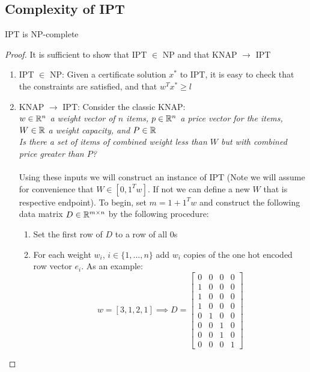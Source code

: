 \documentclass[12pt]{article}
\newcommand{\priv}{\text{IPT}}
\begin{document}
\subsection{Complexity of \gls{IPT}}
\begin{theorem}
    \gls{IPT} is NP-complete
\end{theorem}
\begin{proof}
    It is sufficient to show that \gls{IPT} $\in $ NP and that \gls{KNAP} $ \longrightarrow$  \gls{IPT}
    \begin{enumerate}
        \item \gls{IPT} $\in $ NP: Given a certificate solution $x^*$ to $\priv$, it is easy to check that the constraints are satisfied, and that $w^T x^* \geq l$
        \item \gls{KNAP} $ \longrightarrow$  \gls{IPT}: Consider the classic \gls{KNAP}:
        \\ 
        \textit{$w \in \mathbb{R}^n$ a weight vector of $n$ items, $p \in \mathbb{R}^n$ a price vector for the items, $W\in \mathbb{R}$ a weight capacity, and $P \in \mathbb{R}$}
        \\ 
        \textit{Is there a set of items of combined weight less than $W$ but with combined price greater than $P$?}
        \\~\\ 
        Using these inputs we will construct an instance of \gls{IPT} (Note we will assume for convenience that $W \in [0,1^Tw]$. If not we can define a new $W$ that is respective endpoint). To begin, set $m = 1+ 1^Tw$ and construct the following data matrix $D \in \mathbb{R}^{m\times n}$ by the following procedure:
        \begin{enumerate}
            \item Set the first row of $D$ to a row of all $0$s
            \item For each weight $w_i$, $i\in\{1,...,n\}$ add $w_i$ copies of the one hot encoded row vector $e_i$. As an example:
            \[w = [3,1,2,1] \implies D = \begin{bmatrix}
                0&0&0&0 \\
                1&0&0&0 \\
                1&0&0&0 \\
                1&0&0&0 \\
                0&1&0&0 \\
                0&0&1&0 \\
                0&0&1&0 \\
                0&0&0&1 

\end{bmatrix}\]
\end{enumerate}
\end{enumerate}
\end{proof}
\end{document}
